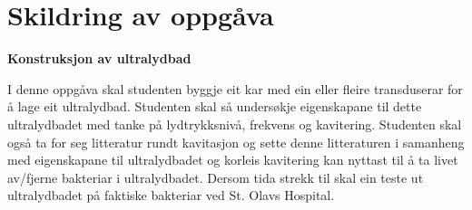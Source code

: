 \section*{Skildring av oppgåva}
{\bf Konstruksjon av ultralydbad}

I denne oppgåva skal studenten byggje eit kar med ein eller fleire transduserar for å lage eit ultralydbad. Studenten skal så undersøkje eigenskapane til dette ultralydbadet med tanke på lydtrykksnivå, frekvens og kavitering. Studenten skal også ta for seg litteratur rundt kavitasjon og sette denne litteraturen i samanheng med eigenskapane til ultralydbadet og korleis kavitering kan nyttast til å ta livet av/fjerne bakteriar i ultralydbadet. Dersom tida strekk til skal ein teste ut ultralydbadet på faktiske bakteriar ved St. Olavs Hospital.